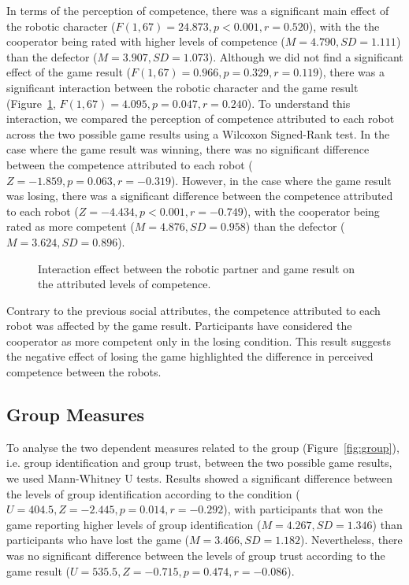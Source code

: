 In terms of the perception of competence, there was a significant main effect of the robotic character ($F(1,67)=24.873, p<0.001, r=0.520$), with the the cooperator being rated with higher levels of competence ($M=4.790, SD=1.111$) than the defector ($M=3.907, SD=1.073$). Although we did not find a significant effect of the game result ($F(1,67)=0.966, p=0.329, r=0.119$), there was a significant interaction between the robotic character and the game result (Figure~\ref{fig:interaction-effect}, $F(1,67)=4.095, p=0.047, r=0.240$). To understand this interaction, we compared the perception of competence attributed to each robot across the two possible game results using a Wilcoxon Signed-Rank test. In the case where the game result was winning, there was no significant difference between the competence attributed to each robot ($Z=-1.859, p=0.063, r=-0.319$). However, in the case where the game result was losing, there was a significant difference between the competence attributed to each robot ($Z=-4.434, p<0.001, r=-0.749$), with the cooperator being rated as more competent ($M=4.876, SD=0.958$) than the defector ($M=3.624, SD=0.896$).


\begin{figure}[ht]
\centering

\caption{Interaction effect between the robotic partner and game result on the attributed levels of competence.}
\label{fig:interaction-effect}
\end{figure}

Contrary to the previous social attributes, the competence attributed to each robot was affected by the game result. Participants have considered the cooperator as more competent only in the losing condition. This result suggests the negative effect of losing the game highlighted the difference in perceived competence between the robots.

\subsection{Group Measures}

To analyse the two dependent measures related to the group (Figure~\ref{fig:group}), i.e. group identification and group trust, between the two possible game results, we used Mann-Whitney U tests. Results showed a significant difference between the levels of group identification according to the condition ($U=404.5, Z=-2.445, p=0.014, r=-0.292$), with participants that won the game reporting higher levels of group identification ($M=4.267, SD=1.346$) than participants who have lost the game ($M=3.466, SD=1.182$). Nevertheless, there was no significant difference between the levels of group trust according to the game result ($U=535.5, Z=-0.715, p=0.474, r=-0.086$).


